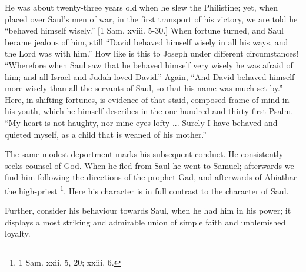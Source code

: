 He was about twenty-three years old when he slew the Philistine;
yet, when placed over Saul's men of war, in the first transport of his
victory, we are told he ``behaved himself wisely.'' [1 Sam.
xviii. 5-30.] When fortune turned, and Saul became jealous of him,
still ``David behaved himself wisely in all his ways, and the Lord
was with him.'' How like is this to Joseph under different
circumstances! ``Wherefore when Saul saw that he behaved himself
very wisely he was afraid of him; and all Israel and Judah loved
David.'' Again, ``And David behaved himself more wisely than
all the servants of Saul, so that his name was much set by.''
Here, in shifting fortunes, is evidence of that staid, composed frame
of mind in his youth, which he himself describes in the one hundred
and thirty-first Psalm. ``My heart is not haughty, nor mine eyes
lofty ... Surely I have behaved and quieted myself, as a child that is
weaned of his mother.''

The same modest deportment marks his subsequent conduct. He
consistently seeks counsel of God. When he fled from Saul he went to
Samuel; afterwards we find him following the directions of the prophet
Gad, and afterwards of Abiathar the high-priest \footnote{1 Sam. xxii. 5, 20; xxiii. 6.}.
Here his character is in full contrast to the character of Saul.

Further, consider his behaviour towards Saul, when he had him in
his power; it displays a most striking and admirable union of simple
faith and unblemished loyalty.

